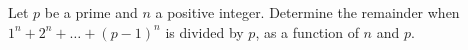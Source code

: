 \begin{problem}
    Let $p$ be a prime and $n$ a positive integer.
    Determine the remainder when $1^n + 2^n + \dots + (p-1)^n$
    is divided by $p$, as a function of $n$ and $p$.

    \label{Z4ECE531}
\end{problem}